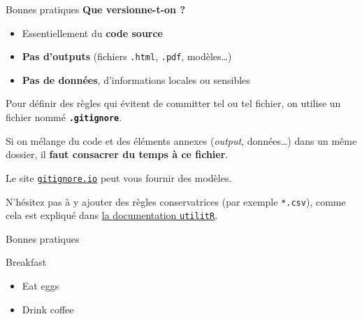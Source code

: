 \documentclass[
  ignorenonframetext,
]{beamer}
\providecommand{\tightlist}{%
  \setlength{\itemsep}{0pt}\setlength{\parskip}{0pt}}\usepackage{longtable,booktabs,array}
\begin{document}
\begin{frame}[fragile]{Bonnes pratiques}
\label{bonnes-pratiques}
\textbf{Que versionne-t-on ?}

\begin{itemize}[<+->]
\tightlist
\item
  Essentiellement du {\textbf{code source}}
\item
  {\textbf{Pas d'outputs}} (fichiers \texttt{.html}, \texttt{.pdf},
  modèles\ldots)
\item
  {\textbf{Pas de données}}, d'informations locales ou sensibles
\end{itemize}

\pause

\begin{tcolorbox}[enhanced jigsaw, toprule=.15mm, leftrule=.75mm, title=\textcolor{quarto-callout-note-color}{\faInfo}\hspace{0.5em}{Note}, titlerule=0mm, breakable, colframe=quarto-callout-note-color-frame, colback=white, bottomrule=.15mm, rightrule=.15mm, toptitle=1mm, coltitle=black, opacitybacktitle=0.6, opacityback=0, colbacktitle=quarto-callout-note-color!10!white, bottomtitle=1mm, left=2mm, arc=.35mm]

Pour définir des règles qui évitent de committer tel ou tel fichier, on
utilise un fichier nommé \textbf{\texttt{.gitignore}}.

Si on mélange du code et des éléments annexes (\emph{output},
données\ldots) dans un même dossier, il {\textbf{faut consacrer du temps
à ce fichier}}.

Le site
\href{https://www.toptal.com/developers/gitignore}{\texttt{gitignore.io}}
peut vous fournir des modèles.

N'hésitez pas à y ajouter des règles conservatrices (par exemple
\texttt{*.csv}), comme cela est expliqué dans
\href{https://www.book.utilitr.org/git.html?q=gitignore\#gitignore}{la
documentation \texttt{utilitR}}.

\end{tcolorbox}
\end{frame}

\begin{frame}{Bonnes pratiques}
\label{bonnes-pratiques-1}
\end{frame}

\begin{frame}{Breakfast}
\label{breakfast}
\begin{itemize}[<+->]
\tightlist
\item
  Eat eggs
\item
  Drink coffee
\end{itemize}
\end{frame}
\end{document}
